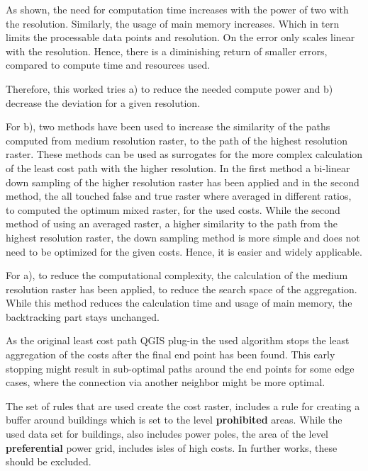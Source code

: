 As shown, the need for computation time increases with the power of two with the resolution. 
Similarly, the usage of main memory increases. 
Which in tern limits the processable data points and resolution.
On the error only scales linear with the resolution. 
Hence, there is a diminishing return of smaller errors, compared to compute time and resources used.

Therefore, this worked tries a) to reduce the needed compute power and b) decrease the deviation for a given resolution.

For b), two methods have been used to increase the similarity of the paths computed from medium resolution raster, to the path of the highest resolution raster.
These methods can be used as surrogates for the more complex calculation of the least cost path with the higher resolution.
In the first method a bi-linear down sampling of the higher resolution raster has been applied and in the second method, the all touched false and true raster where averaged in different ratios, to computed the optimum mixed raster, for the used costs.
While the second method of using an averaged raster, a higher similarity to the path from the highest resolution raster, the down sampling method is more
simple and does not need to be optimized for the given costs.
Hence, it is easier and widely applicable.

For a), to reduce the computational complexity, the calculation of the medium resolution raster has been applied, to reduce the search space of the aggregation.
While this method reduces the calculation time and usage of main memory, the backtracking part stays unchanged.



As the original least cost path QGIS plug-in the used algorithm stops the least aggregation of the costs after the final end point has been found.
This early stopping might result in sub-optimal paths around the end points for some edge cases, where the connection via another neighbor might be more optimal.

The set of rules that are used create the cost raster, includes a rule for creating a buffer around buildings  which is set to the level \textbf{prohibited} areas.
While the used data set for buildings, also includes power poles, the area of the level \textbf{preferential} power grid, includes isles of high costs. 
In further works, these should be excluded.

